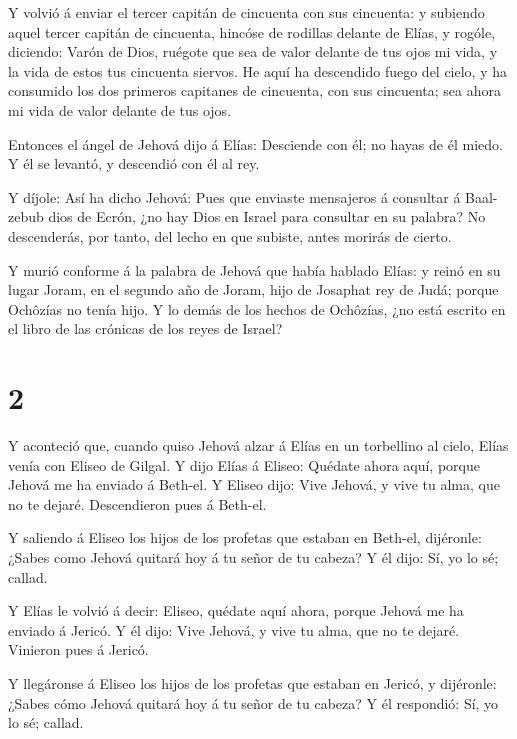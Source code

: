  Y volvió á enviar el tercer capitán de cincuenta con sus
cincuenta: y subiendo aquel tercer capitán de cincuenta, hincóse de
rodillas delante de Elías, y rogóle, diciendo: Varón de Dios, ruégote
que sea de valor delante de tus ojos mi vida, y la vida de estos tus
cincuenta siervos.  He aquí ha descendido fuego del cielo,
y ha consumido los dos primeros capitanes de cincuenta, con sus
cincuenta; sea ahora mi vida de valor delante de tus ojos.

 Entonces el ángel de Jehová dijo á Elías: Desciende con
él; no hayas de él miedo. Y él se levantó, y descendió con él al rey.

 Y díjole: Así ha dicho Jehová: Pues que enviaste
mensajeros á consultar á Baal-zebub dios de Ecrón, ¿no hay Dios en
Israel para consultar en su palabra? No descenderás, por tanto, del
lecho en que subiste, antes morirás de cierto.

 Y murió conforme á la palabra de Jehová que había hablado
Elías: y reinó en su lugar Joram, en el segundo año de Joram, hijo de
Josaphat rey de Judá; porque Ochôzías no tenía hijo.  Y lo
demás de los hechos de Ochôzías, ¿no está escrito en el libro de las
crónicas de los reyes de Israel?

\hypertarget{section-1}{%
\section{2}\label{section-1}}

 Y aconteció que, cuando quiso Jehová alzar á Elías en un
torbellino al cielo, Elías venía con Eliseo de Gilgal.  Y
dijo Elías á Eliseo: Quédate ahora aquí, porque Jehová me ha enviado á
Beth-el. Y Eliseo dijo: Vive Jehová, y vive tu alma, que no te dejaré.
Descendieron pues á Beth-el.

 Y saliendo á Eliseo los hijos de los profetas que estaban
en Beth-el, dijéronle: ¿Sabes como Jehová quitará hoy á tu señor de tu
cabeza? Y él dijo: Sí, yo lo sé; callad.

 Y Elías le volvió á decir: Eliseo, quédate aquí ahora,
porque Jehová me ha enviado á Jericó. Y él dijo: Vive Jehová, y vive tu
alma, que no te dejaré. Vinieron pues á Jericó.

 Y llegáronse á Eliseo los hijos de los profetas que estaban
en Jericó, y dijéronle: ¿Sabes cómo Jehová quitará hoy á tu señor de tu
cabeza? Y él respondió: Sí, yo lo sé; callad.

